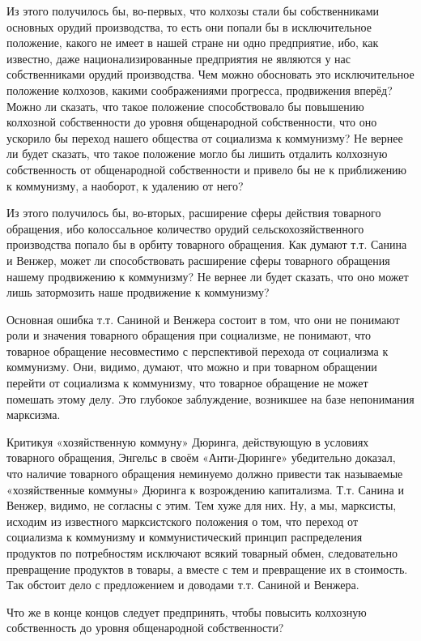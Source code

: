 \documentclass[12pt, a4paper, openany]{book}
\begin{document}
Из этого получилось бы, во-первых, что колхозы стали бы собственниками основных орудий производства, то есть они попали бы в исключительное положение, какого не имеет в нашей стране ни одно предприятие, ибо, как известно, даже национализированные предприятия не являются у нас собственниками орудий производства. Чем можно обосновать это исключительное положение колхозов, какими соображениями прогресса, продвижения вперёд? Можно ли сказать, что такое положение способствовало бы повышению колхозной собственности до уровня общенародной собственности, что оно ускорило бы переход нашего общества от социализма к коммунизму? Не вернее ли будет сказать, что такое положение могло бы лишить отдалить колхозную собственность от общенародной собственности и привело бы не к приближению к коммунизму, а наоборот, к удалению от него?

Из этого получилось бы, во-вторых, расширение сферы действия товарного обращения, ибо колоссальное количество орудий сельскохозяйственного производства попало бы в орбиту товарного обращения. Как думают т.т. Санина и Венжер, может ли способствовать расширение сферы товарного обращения нашему продвижению к коммунизму? Не вернее ли будет сказать, что оно может лишь затормозить наше продвижение к коммунизму?

Основная ошибка т.т. Саниной и Венжера состоит в том, что они не понимают роли и значения товарного обращения при социализме, не понимают, что товарное обращение несовместимо с перспективой перехода от социализма к коммунизму. Они, видимо, думают, что можно и при товарном обращении перейти от социализма к коммунизму, что товарное обращение не может помешать этому делу. Это глубокое заблуждение, возникшее на базе непонимания марксизма.

Критикуя «хозяйственную коммуну» Дюринга, действующую в условиях товарного обращения, Энгельс в своём «Анти-Дюринге» убедительно доказал, что наличие товарного обращения неминуемо должно привести так называемые «хозяйственные коммуны» Дюринга к возрождению капитализма. Т.т. Санина и Венжер, видимо, не согласны с этим. Тем хуже для них. Ну, а мы, марксисты, исходим из известного марксистского положения о том, что переход от социализма к коммунизму и коммунистический принцип распределения продуктов по потребностям исключают всякий товарный обмен, следовательно превращение продуктов в товары, а вместе с тем и превращение их в стоимость. Так обстоит дело с предложением и доводами т.т. Саниной и Венжера.

Что же в конце концов следует предпринять, чтобы повысить колхозную собственность до уровня общенародной собственности?
\end{document}
